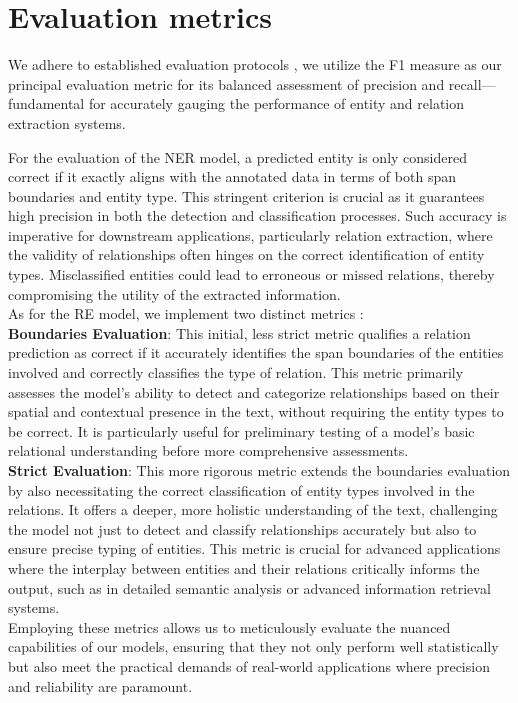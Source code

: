 \section{Evaluation metrics}
\label{sec:evaluationmetrics}
We adhere to established evaluation protocols \cite{taille-etal-2020-lets}, we utilize the F1 measure as our principal evaluation metric for its balanced assessment of precision and recall—fundamental for accurately gauging the performance of entity and relation extraction systems.

For the evaluation of the NER model, a predicted entity is only considered correct if it exactly aligns with the annotated data in terms of both span boundaries and entity type. This stringent criterion is crucial as it guarantees high precision in both the detection and classification processes. Such accuracy is imperative for downstream applications, particularly relation extraction, where the validity of relationships often hinges on the correct identification of entity types. Misclassified entities could lead to erroneous or missed relations, thereby compromising the utility of the extracted information.\\

As for the RE model, we implement two distinct metrics \cite{bekoulis-etal-2018-adversarial}:\\
\textbf{Boundaries Evaluation}: This initial, less strict metric qualifies a relation prediction as correct if it accurately identifies the span boundaries of the entities involved and correctly classifies the type of relation. This metric primarily assesses the model's ability to detect and categorize relationships based on their spatial and contextual presence in the text, without requiring the entity types to be correct. It is particularly useful for preliminary testing of a model's basic relational understanding before more comprehensive assessments.\\
\textbf{Strict Evaluation}: This more rigorous metric extends the boundaries evaluation by also necessitating the correct classification of entity types involved in the relations. It offers a deeper, more holistic understanding of the text, challenging the model not just to detect and classify relationships accurately but also to ensure precise typing of entities. This metric is crucial for advanced applications where the interplay between entities and their relations critically informs the output, such as in detailed semantic analysis or advanced information retrieval systems.\\
Employing these metrics allows us to meticulously evaluate the nuanced capabilities of our models, ensuring that they not only perform well statistically but also meet the practical demands of real-world applications where precision and reliability are paramount.

